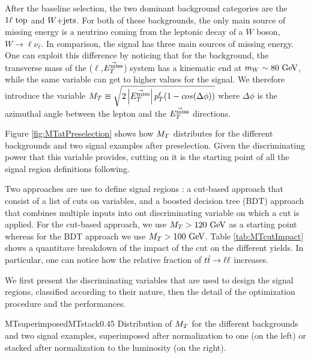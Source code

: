     After the baseline selection, the two dominant background categories are the $1\ell~\text{top}$
    and $\text{$W$+jets}$. For both of these backgrounds, the only main source of missing energy is a neutrino
    coming from the leptonic decay of a $W$ boson, $W \rightarrow \ell \nu_{\ell}$. In comparison,
    the signal has three main sources of missing energy. One can exploit this difference by noticing
    that for the background, the transverse mass of the ($\ell$,$\vec{E_T^\text{miss}}$) system has a kinematic
    end at $m_{W} \sim 80 ~\text{GeV}$, while the same variable can get to higher values for the signal.
    We therefore introduce the variable $M_T \equiv \sqrt{2 \left|\vec{E_T^\text{miss}}\right| p_T^\ell ( 1 - cos( \Delta \phi  ) ) }$
    where $\Delta \phi$ is the azimuthal angle between the lepton and the $\vec{E_T^\text{miss}}$ directions.

    Figure \ref{fig:MTatPreselection} shows how $M_T$ distributes for the different backgrounds and
    two signal examples after preselection. Given the discriminating power that this variable provides,
    cutting on it is the starting point of all the signal region definitions following. 
    
    Two approaches are use to define signal regions : a cut-based approach that consist of a list
    of cuts on variables, and a boosted decision tree (BDT) approach that combines multiple inputs into
    ont discriminating variable on which a cut is applied. For the cut-based approach, we use $M_T > 120 ~\text{GeV}$
    as a starting point whereas for the BDT approach we use $M_T > 100 ~\text{GeV}$. Table \ref{tab:MTcutImpact}
    shows a quantitave breakdown of the impact of the cut on the different yields. In particular, 
    one can notice how the relative fraction of $t\bar{t} \rightarrow \ell \ell$ increases.

    We first present the discriminating variables that are used to design the signal regions, classified
    according to their nature, then the detail of the optimization procedure and the performances.

                     {MTsuperimposed}{MTstack}{0.45}
                     {Distribution of $M_T$ for the different backgrounds and two signal examples,
                     superimposed after normalization to one (on the left) or stacked after normalization to the luminosity (on the right).}

